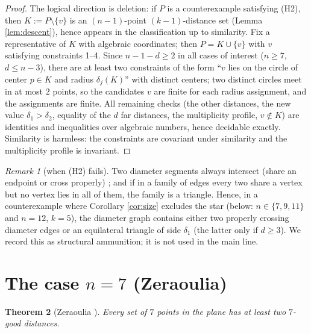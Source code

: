 \documentclass[11pt]{article}
\newtheorem{theorem}{Theorem}[section]
\theoremstyle{definition}
\theoremstyle{remark}
\newtheorem{remark}[theorem]{Remark}
\begin{document}
\begin{proof}
The logical direction is deletion: if $P$ is a counterexample satisfying (H2), then
$K := P \setminus \{v\}$ is an $(n-1)$-point $(k-1)$-distance set (Lemma
\ref{lem:descent}), hence appears in the classification up to similarity. Fix a
representative of $K$ with algebraic coordinates; then $P = K \cup \{v\}$ with $v$
satisfying constraints 1--4. Since $n - 1 - d \ge 2$ in all cases of interest
($n \ge 7$, $d \le n - 3$), there are at least two constraints of the form ``$v$ lies on
the circle of center $p \in K$ and radius $\delta_j(K)$'' with distinct centers; two
distinct circles meet in at most $2$ points, so the candidates $v$ are finite for each
radius assignment, and the assignments are finite. All remaining checks (the other
distances, the new value $\delta_1 > \delta_2$, equality of the $d$ far distances, the
multiplicity profile, $v \notin K$) are identities and inequalities over algebraic
numbers, hence decidable exactly. Similarity is harmless: the constraints are covariant
under similarity and the multiplicity profile is invariant.
\end{proof}

\begin{remark}[when (H2) fails]\label{rem:nostar}
Two diameter segments always intersect (share an endpoint or cross properly)
\cite{HoPa34}; and if in a family of edges every two share a vertex but no vertex lies in
all of them, the family is a triangle. Hence, in a counterexample where Corollary
\ref{cor:size} excludes the star (below: $n \in \{7, 9, 11\}$ and $n = 12$, $k = 5$), the
diameter graph contains either two properly crossing diameter edges or an equilateral
triangle of side $\delta_1$ (the latter only if $d \ge 3$). We record this as structural
ammunition; it is not used in the main line.
\end{remark}

\section{The case $n = 7$ (Zeraoulia)}\label{sec:n7}

\begin{theorem}[{Zeraoulia \cite{Zeraoulia26}}]\label{thm:n7}
Every set of $7$ points in the plane has at least two $7$-good distances.
\end{theorem}
\end{document}
